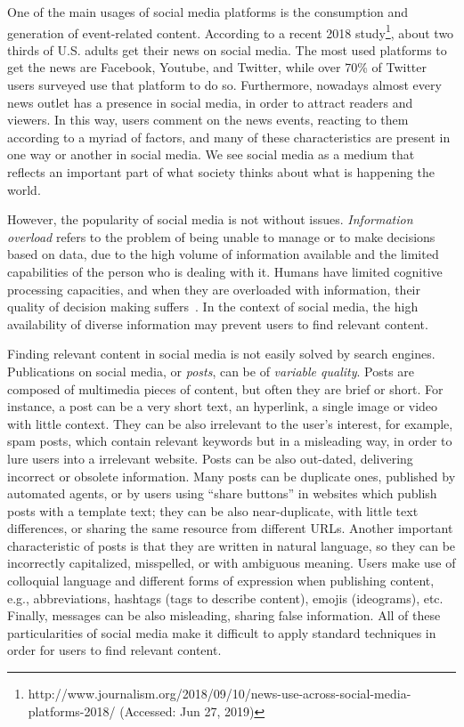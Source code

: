 \documentclass[runningheads]{llncs}
\begin{document}


One of the main usages of social media platforms is the consumption and
generation of event-related content. 
%
According to a recent 2018
study\footnote{http://www.journalism.org/2018/09/10/news-use-across-social-media-platforms-2018/
(Accessed: Jun 27, 2019)}, about two thirds of U.S. adults get their news on
social media.
%
The most used platforms to get the news are Facebook, Youtube, and Twitter,
while over 70\% of Twitter users surveyed use that platform to do so.
%
Furthermore, nowadays almost every news outlet has a presence in social media,
in order to attract readers and viewers.
%
In this way, users comment on the news events, reacting to them according to a
myriad of factors, and many of these characteristics are present in one way or
another in social media.
%
We see social media as a medium that reflects an important 
part of what society thinks about what is happening the world.





However, the popularity of social media is not without issues. 
%
{\em Information overload} refers to the problem of being unable to manage or to
make decisions based on data, due to the high volume of information available
and the limited capabilities of the person who is dealing with it. 
%
Humans have limited cognitive processing capacities, and when they are
overloaded with information, their quality of decision making
suffers~\cite{gross1964managing}. 
%
In the context of social media, the high availability of diverse information may
prevent users to find relevant content.


Finding relevant content in social media is not easily solved by search engines.
%
Publications on social media, or {\em posts}, can be of {\em variable quality}.
%
Posts are composed of multimedia pieces of content, but often they are brief or
short.
%
For instance, a post can be a very short text, an hyperlink, a single image or
video with little context.
%
They can be also irrelevant to the user's interest, for example, spam posts,
which contain relevant keywords but in a misleading way, in order to lure users
into a irrelevant website. 
%
Posts can be also out-dated, delivering incorrect or obsolete information. 
%
Many posts can be duplicate ones, published by automated agents, or by users
using ``share buttons'' in websites which publish posts with a template text; 
%
they can be also near-duplicate, with little text differences, or sharing the
same resource from different URLs.
%
Another important characteristic of posts is that they are written in natural
language, so they can be incorrectly capitalized, misspelled, or with ambiguous
meaning.
%
Users make use of colloquial language and different forms of expression when
publishing content, e.g., abbreviations, hashtags (tags to describe content),
emojis (ideograms), etc.
%
Finally, messages can be also misleading, sharing false information.
%
All of these particularities of social media make it difficult to apply standard
techniques in order for users to find relevant content.
\end{document}
